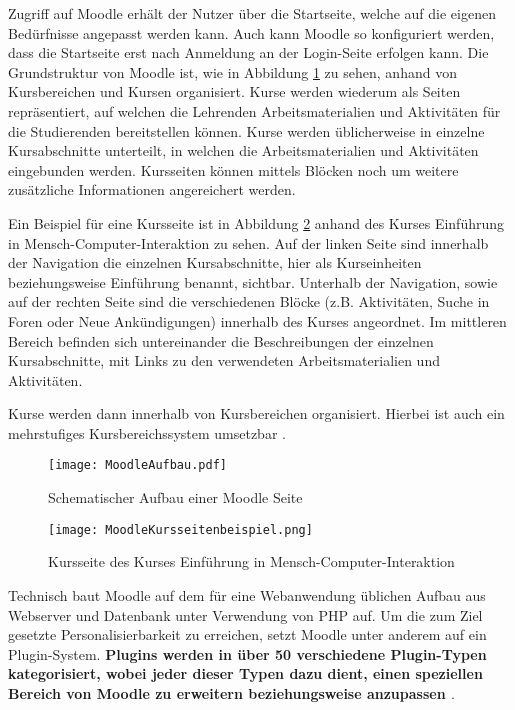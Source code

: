 Zugriff auf Moodle erhält der Nutzer über die Startseite, welche auf die eigenen Bedürfnisse angepasst werden kann. Auch kann Moodle so konfiguriert werden, dass die Startseite erst nach Anmeldung an der Login-Seite erfolgen kann. Die Grundstruktur von Moodle ist, wie in Abbildung \ref{fig:MoodleAufbau} zu sehen, anhand von Kursbereichen und Kursen organisiert. Kurse werden wiederum als Seiten repräsentiert, auf welchen die Lehrenden Arbeitsmaterialien und Aktivitäten für die Studierenden bereitstellen können. Kurse werden üblicherweise in einzelne Kursabschnitte unterteilt, in welchen die Arbeitsmaterialien und Aktivitäten eingebunden werden. Kursseiten können mittels Blöcken noch um weitere zusätzliche Informationen angereichert werden.

Ein Beispiel für eine Kursseite ist in Abbildung \ref{fig:MoodleKursseitenbeispiel} anhand des Kurses \glqq Einführung in Mensch-Computer-Interaktion\grqq{} zu sehen. Auf der linken Seite sind innerhalb der Navigation die einzelnen Kursabschnitte, hier als Kurseinheiten beziehungsweise Einführung  benannt, sichtbar. Unterhalb der Navigation, sowie auf der rechten Seite sind die verschiedenen Blöcke (z.B. \glqq Aktivitäten\grqq{}, \glqq Suche in Foren\grqq{} oder \glqq Neue Ankündigungen\grqq{}) innerhalb des Kurses angeordnet. Im mittleren Bereich befinden sich untereinander die Beschreibungen der einzelnen Kursabschnitte, mit Links zu den verwendeten Arbeitsmaterialien und Aktivitäten.

Kurse werden dann innerhalb von Kursbereichen organisiert. Hierbei ist auch ein mehrstufiges Kursbereichssystem umsetzbar \citep{moodle2015aufbau}.

\begin{figure}[h!]
\texttt{[image: MoodleAufbau.pdf]}
\caption{\label{fig:MoodleAufbau}Schematischer Aufbau einer Moodle Seite}
\end{figure}

\begin{figure}[h!]
\texttt{[image: MoodleKursseitenbeispiel.png]}
\caption{\label{fig:MoodleKursseitenbeispiel}Kursseite des Kurses \glqq Einführung in Mensch-Computer-Interaktion\grqq{} \citep{fernuniversitaet2018mensch}}
\end{figure}

Technisch baut Moodle auf dem für eine Webanwendung üblichen Aufbau aus Webserver und Datenbank unter Verwendung von PHP auf. Um die zum Ziel gesetzte Personalisierbarkeit zu erreichen, setzt Moodle unter anderem auf ein Plugin-System. \textbf{Plugins werden in über 50 verschiedene Plugin-Typen kategorisiert, wobei jeder dieser Typen dazu dient, einen speziellen Bereich von Moodle zu erweitern beziehungsweise anzupassen \citep{moodle2017plugin}}.


